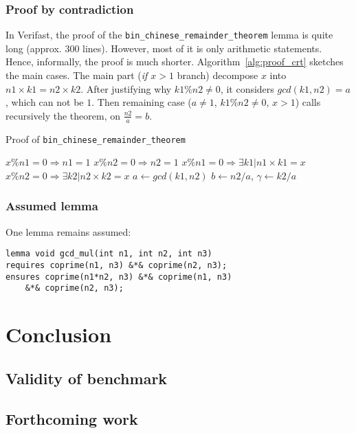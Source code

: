 \documentclass[oneside]{article}
\begin{document}
\subsubsection{Proof by contradiction}
In Verifast, the proof of the \texttt{bin\_chinese\_remainder\_theorem} lemma is quite long (approx. 300 lines). However, most of it is only arithmetic statements. Hence, informally, the proof is much shorter. Algorithm~\ref{alg:proof_crt} sketches the main cases. The main part (\emph{if $x > 1$} branch) decompose $x$ into $n1\times k1 = n2\times k2$. After justifying why $k1\%n2 \neq 0$, it considers $gcd(k1, n2) = a$, which can not be $1$. Then remaining case ($a \neq 1$, $k1\%n2 \neq 0$, $x > 1$) calls recursively the theorem, on $\frac{n2}{a} = b$.
\begin{algorithm}
	\caption{Proof of \texttt{bin\_chinese\_remainder\_theorem}\label{alg:proof_crt}}
	{
		$x\%n1 = 0 \Rightarrow n1 = 1$\;
		$x\%n2 = 0 \Rightarrow n2 = 1$\;
		\;
		\;
		\Contradiction\;
	}
	{
		$x\%n1 = 0 \Rightarrow \exists k1 | n1\times k1 = x$ \;
		$x\%n2 = 0 \Rightarrow \exists k2 | n2\times k2 = x$ \;
		\;
		{
			$a \longleftarrow gcd(k1, n2)$\;
			$b \longleftarrow n2/a$, \;
			$\gamma \longleftarrow k2/a$\;
			\;
		}
	}
\end{algorithm}


\subsubsection{Assumed lemma}
One lemma remains assumed: 
\begin{lemma}
	\begin{lstlisting}
lemma void gcd_mul(int n1, int n2, int n3)
requires coprime(n1, n3) &*& coprime(n2, n3);
ensures coprime(n1*n2, n3) &*& coprime(n1, n3) 
	&*& coprime(n2, n3);
	\end{lstlisting}
\end{lemma}


\section{Conclusion}
\subsection{Validity of benchmark}
\subsection{Forthcoming work}
\end{document}
